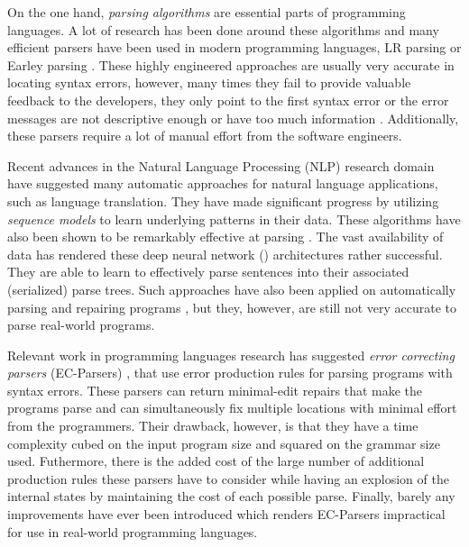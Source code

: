 On the one hand, \emph{parsing algorithms} are essential parts of programming
languages. A lot of research has been done around these algorithms and many
efficient parsers have been used in modern programming languages, \eg LR parsing
\citep{Aho1974} or Earley parsing \citep{Earley_1970}. These highly engineered
approaches are usually very accurate in locating syntax errors, however, many
times they fail to provide valuable feedback to the developers, \eg they only
point to the first syntax error or the error messages are not descriptive enough
or have too much information \citep{Kummerfeld2003, Ahadi_2018,
VanDerSpek_2005}. Additionally, these parsers require a lot of manual effort
from the software engineers.

Recent advances in the Natural Language Processing (NLP) research domain
\citep{Sutskever_2014, Hardalov_2018} have suggested many automatic approaches
for natural language applications, such as language translation. They have made
significant progress by utilizing \emph{sequence models} to learn underlying
patterns in their data. These algorithms have also been shown to be remarkably
effective at parsing \citep{Vinyals2015}. The vast availability of data has
rendered these deep neural network (\dnn) architectures rather successful. They
are able to learn to effectively parse sentences into their associated
(serialized) parse trees. Such approaches have also been applied on
automatically parsing and repairing programs \citep{Ahmed_2021}, but they,
however, are still not very accurate to parse real-world programs.

Relevant work in programming languages research has suggested \emph{error
correcting parsers} (EC-Parsers) \citep{Aho_1972}, that use error production
rules for parsing programs with syntax errors. These parsers can return
minimal-edit repairs that make the programs parse and can simultaneously fix
multiple locations with minimal effort from the programmers. Their drawback,
however, is that they have a time complexity cubed on the input program size and
squared on the grammar size used. Futhermore, there is the added cost of the
large number of additional production rules these parsers have to consider while
having an explosion of the internal states by maintaining the cost of each
possible parse. Finally, barely any improvements have ever been introduced
\citep{McLean1996, Rajasekaran2014} which renders EC-Parsers impractical for use
in real-world programming languages.

